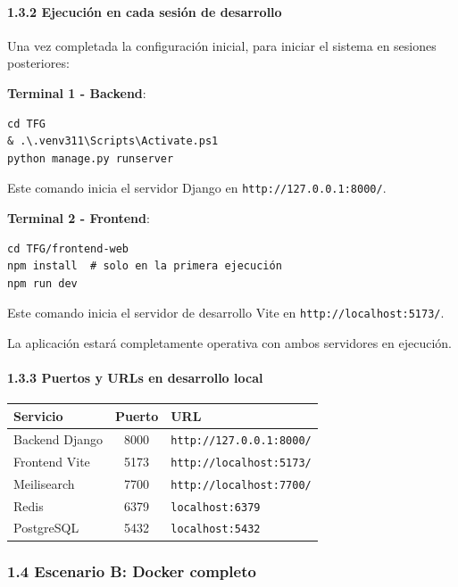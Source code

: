 \paragraph*{1.3.2 Ejecución en cada sesión de desarrollo}

Una vez completada la configuración inicial, para iniciar el sistema en sesiones posteriores:

\textbf{Terminal 1 - Backend}:
\begin{verbatim}
cd TFG
& .\.venv311\Scripts\Activate.ps1
python manage.py runserver
\end{verbatim}

Este comando inicia el servidor Django en \texttt{http://127.0.0.1:8000/}.

\textbf{Terminal 2 - Frontend}:
\begin{verbatim}
cd TFG/frontend-web
npm install  # solo en la primera ejecución
npm run dev
\end{verbatim}

Este comando inicia el servidor de desarrollo Vite en \texttt{http://localhost:5173/}.

La aplicación estará completamente operativa con ambos servidores en ejecución.

\paragraph*{1.3.3 Puertos y URLs en desarrollo local}

\begin{table}[h]
\centering
\begin{tabular}{|l|c|l|}
\hline
\textbf{Servicio} & \textbf{Puerto} & \textbf{URL} \\
\hline
Backend Django & 8000 & \texttt{http://127.0.0.1:8000/} \\
Frontend Vite & 5173 & \texttt{http://localhost:5173/} \\
Meilisearch & 7700 & \texttt{http://localhost:7700/} \\
Redis & 6379 & \texttt{localhost:6379} \\
PostgreSQL & 5432 & \texttt{localhost:5432} \\
\hline
\end{tabular}
\end{table}

\subsubsection*{1.4 Escenario B: Docker completo}


